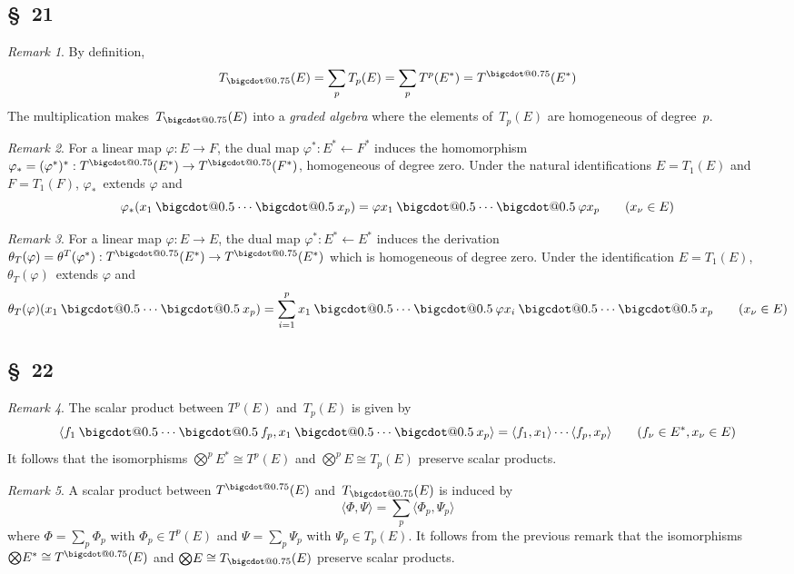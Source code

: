 \documentclass[letterpaper,12pt]{article}
\makeatletter
\newcommand{\from}{\leftarrow}
\newcommand{\iso}{\cong}
\newcommand{\bigcdot}[1]{\mathbin{\mathpalette\bigcdot@{#1}}}
\newcommand{\bigcdot@}[2]{%
  \sbox0{$#1\vcenter{}$}%
  \sbox2{$#1\cdot\m@th$}%
  \hbox{%
    \hfil
    \raise\ht0\hbox{%
      \scalebox{#2}{%
        \lower\ht0\hbox{$#1\bullet\m@th$}%
      }%
    }%
    \hfil
  }%
}
\newcommand{\bigtprod}{\bigotimes}
\newcommand{\medtprod}{{\textstyle\bigtprod}}
\newcommand{\fprod}{\bigcdot{0.5}}
\newcommand{\tdot}{\bigcdot{0.75}}
\newcommand{\sprod}[2]{\langle#1,#2\rangle}
\newcommand{\multi}[4]{#2_{#3}#1\cdots#1#2_{#4}}
\newcommand{\fprods}[3]{\multi{\fprod}{#1}{#2}{#3}}
\theoremstyle{definition}
\theoremstyle{remark}
\newtheorem*{rmk}{Remark}
\makeatother
\begin{document}
\subsection*{\S~21}
\begin{rmk}
By definition,
\[T_{\tdot}(E)=\sum_p T_p(E)=\sum_p T^p(E^*)=T^{\tdot}(E^*)\]
The multiplication makes~\(T_{\tdot}(E)\) into a \emph{graded algebra} where the elements of~\(T_p(E)\) are homogeneous of degree~\(p\).
\end{rmk}

\begin{rmk}
For a linear map \(\varphi:E\to F\), the dual map \(\varphi^*:E^*\from F^*\) induces the homomorphism \(\varphi_*=(\varphi^*)^*:T^{\tdot}(E^*)\to T^{\tdot}(F^*)\), homogeneous of degree zero. Under the natural identifications \(E=T_1(E)\) and \(F=T_1(F)\), \(\varphi_*\)~extends \(\varphi\) and
\[\varphi_*(\fprods{x}{1}{p})=\fprods{\varphi x}{1}{p}\qquad(x_{\nu}\in E)\]
\end{rmk}

\begin{rmk}
For a linear map \(\varphi:E\to E\), the dual map \(\varphi^*:E^*\from E^*\) induces the derivation \(\theta_T(\varphi)=\theta^T(\varphi^*):T^{\tdot}(E^*)\to T^{\tdot}(E^*)\) which is homogeneous of degree zero. Under the identification \(E=T_1(E)\), \(\theta_T(\varphi)\)~extends \(\varphi\) and
\[\theta_T(\varphi)(\fprods{x}{1}{p})=\sum_{i=1}^p x_1\fprod\cdots\fprod\varphi x_i\fprod\cdots\fprod x_p\qquad(x_{\nu}\in E)\]
\end{rmk}

\subsection*{\S~22}
\begin{rmk}
The scalar product between \(T^p(E)\) and~\(T_p(E)\) is given by
\[\sprod{\fprods{f}{1}{p}}{\fprods{x}{1}{p}}=\sprod{f_1}{x_1}\cdots\sprod{f_p}{x_p}\qquad(f_{\nu}\in E^*, x_{\nu}\in E)\]
It follows that the isomorphisms \(\medtprod^p E^*\iso T^p(E)\) and \(\medtprod^p E\iso T_p(E)\) preserve scalar products.
\end{rmk}

\begin{rmk}
A scalar product between \(T^{\tdot}(E)\) and~\(T_{\tdot}(E)\) is induced by
\[\sprod{\Phi}{\Psi}=\sum_p\sprod{\Phi_p}{\Psi_p}\]
where \(\Phi=\sum_p\Phi_p\) with \(\Phi_p\in T^p(E)\) and \(\Psi=\sum_p\Psi_p\) with \(\Psi_p\in T_p(E)\).
It follows from the previous remark that the isomorphisms \(\medtprod E^*\iso T^{\tdot}(E)\) and \(\medtprod E\iso T_{\tdot}(E)\) preserve scalar products.
\end{rmk}
\end{document}
